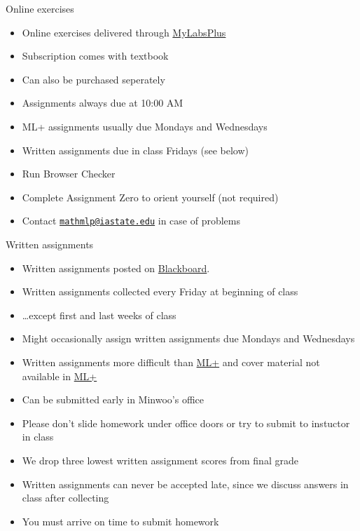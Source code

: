 \documentclass[xcolor=dvipsnames]{beamer}
\theoremstyle{definition}
\begin{document}
\begin{frame}{Online exercises}
\begin{itemize}
\item Online exercises delivered through
\href{http://iastate.mylabsplus.com}{\color{blue} MyLabsPlus}
\item Subscription comes with textbook
\item Can also be purchased seperately
\item Assignments always due at 10:00 AM
\item ML+ assignments usually due Mondays and Wednesdays
\item Written assignments due in class Fridays (see below)
\item Run Browser Checker
\item Complete Assignment Zero to orient yourself (not required)
\item Contact
\href{mailto://mathmlp@iastate.edu}{\color{blue}\tt mathmlp@iastate.edu}
in case of problems
\end{itemize}
\end{frame}

\begin{frame}{Written assignments}
\begin{itemize}
\item Written assignments posted on
\href{https://bb.its.iastate.edu}{\color{blue} Blackboard}.
\item Written assignments collected \alert{every Friday}
at \alert{beginning} of class
\item \dots except first and last weeks of class
\item Might occasionally assign written assignments
due Mondays and Wednesdays
\item Written assignments more difficult than 
\href{http://iastate.mylabsplus.com}{\color{blue}ML+}
and cover material not available in
\href{http://iastate.mylabsplus.com}{\color{blue}ML+}
\item Can be submitted early in Minwoo's office
\item Please don't slide homework under office doors or try to
submit to instuctor in class
\item We drop three lowest written assignment scores from final grade
\item Written assignments can \alert{never} be accepted late,
since we discuss answers in class after collecting
\item You must arrive on time to submit homework
\end{itemize}
\end{frame}
\end{document}
